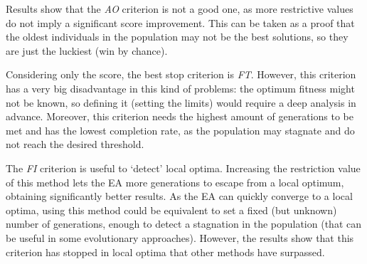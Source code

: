 \documentclass[runningheads,a4paper]{llncs}
\begin{document}

Results show that the \textit{AO} criterion is not a good one, as more restrictive values do not imply a significant score improvement. This can be taken as a proof that the oldest individuals in the population may not be the best solutions, so they are just the luckiest (win by chance).


Considering only the score, the best stop criterion is \textit{FT}. However, this criterion has a very big disadvantage in this kind of problems: the optimum fitness might not be known, so defining it (setting the limits) would require a deep analysis in advance. Moreover, this criterion needs the highest amount of generations to be met and has the lowest completion rate, as the population may stagnate and do not reach the desired threshold. 

The \textit{FI} criterion is useful to `detect' local optima. Increasing the restriction value of this method lets the EA more generations to escape from a local optimum, obtaining significantly better results. As the EA can quickly converge to a local optima, using this method could be equivalent to set a fixed (but unknown) number of generations, enough to detect a stagnation in the population (that can be useful in some evolutionary approaches). However, the results show that this criterion has stopped in local optima that other methods have surpassed.
\end{document}
